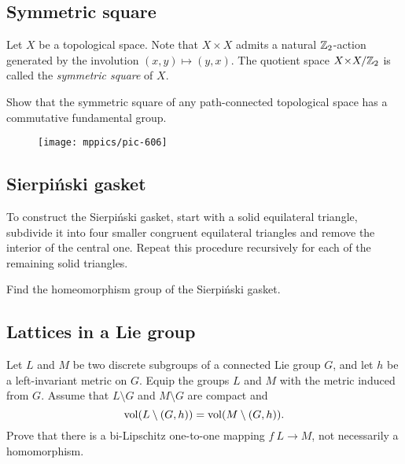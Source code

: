 \subsection*{Symmetric square\easy}\label{Symmetric square}

Let $X$ be a topological space.
Note that $X{\times} X$ admits a natural $\mathbb{Z}_2$-action generated by the involution $(x,y)\mapsto (y,x)$.
The quotient  space $X{\times} X/\mathbb{Z}_2$ is called the \emph{symmetric square} of $X$.

\begin{pr} 
Show that the symmetric square 
of any path-connected topological space 
has a commutative fundamental group.
\end{pr}

{

\begin{wrapfigure}{r}{23 mm}
\vskip-0mm
\centering
\texttt{[image: mppics/pic-606]}
\end{wrapfigure}

\subsection*{Sierpi\'nski gasket\easy}\label{Sierpinski triangle}

To construct the Sierpi\'nski gasket, start with a solid  equilateral triangle, subdivide it into four smaller congruent equilateral triangles and remove the interior of the central one.
Repeat this procedure recursively for each of the remaining solid triangles.

}

\begin{pr} 
Find the homeomorphism group of the Sierpi\'nski gasket.
\end{pr}



\subsection*{Lattices in a Lie group}\label{Boys and girls in a Lie group}

\begin{pr}
Let $L$ and $M$ be two discrete subgroups of a connected Lie group $G$,
and let $h$ be a left-invariant metric on $G$.
Equip the groups $L$ and $M$ 
with the metric induced from $G$.
Assume that $L\setminus G$ and $M\setminus G$ are compact and
$$\operatorname{\rm vol}\nolimits(L\setminus (G,h))
=
\operatorname{\rm vol}\nolimits(M\setminus (G,h)).$$
Prove that there is a bi-Lipschitz one-to-one mapping $f\:L
\to
M$, not necessarily a homomorphism.
\end{pr}



